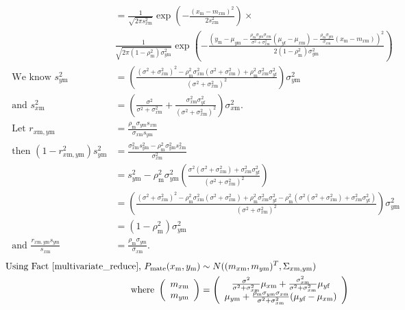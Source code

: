\documentclass{article}
\newcommand{\x}[1]{\text{#1}}
\begin{document}
\begin{pf}
\begin{enumerate}
\begin{align*}
\\&=\frac{1}{\sqrt{2\pi s_{x\x{m}}^2}}\exp\left(-\frac{(x_\x{m}-m_{x\x{m}})^2}{2s_{x\x{m}}^2}\right)\times
\\&\frac{1}{\sqrt{2\pi(1-\rho_\x{m}^2)\sigma_{y\x{m}}^2}}\exp\left(-\frac{\left(y_\x{m}-\mu_{y\x{m}}-\frac{\rho_\x{m}\sigma_{y\x{m}}\sigma_{x\x{m}}}{\sigma^2+\sigma_{x\x{m}}^2}(\mu_{y\x{f}}-\mu_{x\x{m}})-\frac{\rho_\x{m}\sigma_{y\x{m}}}{\sigma_{x\x{m}}}(x_\x{m}-m_{x\x{m}})\right)^2}{2(1-\rho_\x{m}^2)\sigma_{y\x{m}}^2}\right)
\\ \text{ We know } s_{y\x{m}}^2&=\left(\frac{(\sigma^2+\sigma_{x\x{m}}^2)^2-\rho_\x{m}^2\sigma_{x\x{m}}^2(\sigma^2+\sigma_{x\x{m}}^2)+\rho_\x{m}^2\sigma_{x\x{m}}^2\sigma_{y\x{f}}^2}{(\sigma^2+\sigma_{x\x{m}}^2)^2}\right)\sigma_{y\x{m}}^2
\\ \text{ and } s_{x\x{m}}^2&=\left(\frac{\sigma^2}{\sigma^2+\sigma_{x\x{m}}^2}+\frac{\sigma_{x\x{m}}^2\sigma_{y\x{f}}^2}{(\sigma^2+\sigma_{x\x{m}}^2)^2}\right)\sigma_{x\x{m}}^2.
\\\text{ Let } r_{x\x{m},y\x{m}}&=\frac{\rho_\x{m}\sigma_{y\x{m}}s_{x\x{m}}}{\sigma_{x\x{m}}s_{y\x{m}}}
\\ \text{ then } (1-r_{x\x{m},y\x{m}}^2)s_{y\x{m}}^2&=\frac{\sigma_{x\x{m}}^2s_{y\x{m}}^2-\rho_\x{m}^2\sigma_{y\x{m}}^2s_{x\x{m}}^2}{\sigma_{x\x{m}}^2}
\\&=s_{y\x{m}}^2-\rho_\x{m}^2\sigma_{y\x{m}}^2\left(\frac{\sigma^2(\sigma^2+\sigma_{x\x{m}}^2)+\sigma_{x\x{m}}^2\sigma_{y\x{f}}^2}{(\sigma^2+\sigma_{x\x{m}}^2)^2}\right)
\\&=\left(\frac{(\sigma^2+\sigma_{x\x{m}}^2)^2-\rho_\x{m}^2\sigma_{x\x{m}}^2(\sigma^2+\sigma_{x\x{m}}^2)+\rho_\x{m}^2\sigma_{x\x{m}}^2\sigma_{y\x{f}}^2-\rho_\x{m}^2(\sigma^2(\sigma^2+\sigma_{x\x{m}}^2)+\sigma_{x\x{m}}^2\sigma_{y\x{f}}^2)}{(\sigma^2+\sigma_{x\x{m}}^2)^2}\right)\sigma_{y\x{m}}^2
\\&=(1-\rho_\x{m}^2)\sigma_{y\x{m}}^2
\\ \text{ and } \frac{r_{x\x{m},y\x{m}}s_{y\x{m}}}{s_{x\x{m}}}&=\frac{\rho_\x{m}\sigma_{y\x{m}}}{\sigma_{x\x{m}}}.
\end{align*}
\begin{align*}
\text{Using Fact \ref{multivariate_reduce}, } P_\text{mate}(x_\x{m},y_\x{m})&\sim N((m_{x\x{m}},m_{y\x{m}})^T,\Sigma_{x\x{m},y\x{m}}) 
\\ \text{ where } \left(\begin{array}{c}m_{x\x{m}} \\ m_{y\x{m}} \end{array}\right)&=\left(\begin{array}{c}\frac{\sigma^2}{\sigma^2+\sigma_{x\x{m}}^2}\mu_{x\x{m}}+\frac{\sigma_{x\x{m}}^2}{\sigma^2+\sigma_{x\x{m}}^2}\mu_{y\x{f}} \\ \mu_{y\x{m}}+\frac{\rho_\x{m}\sigma_{y\x{m}}\sigma_{x\x{m}}}{\sigma^2+\sigma_{x\x{m}}^2}(\mu_{y\x{f}}-\mu_{x\x{m}}) \end{array}\right)

\end{align*}
\end{enumerate}
\end{pf}
\end{document}
